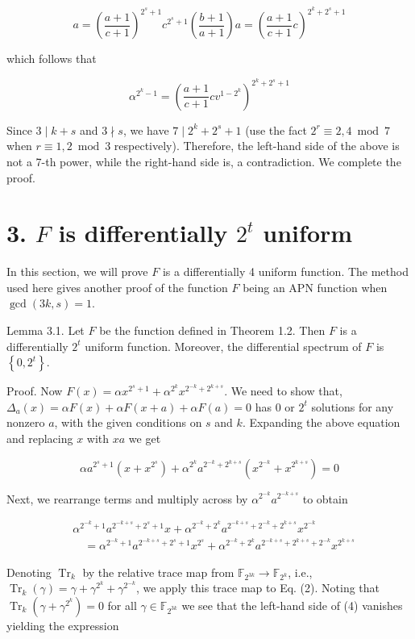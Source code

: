 \documentclass[10pt]{article}
\begin{document}
$$
a=\left(\frac{a+1}{c+1}\right)^{2^{s}+1} c^{2^{s}+1}\left(\frac{b+1}{a+1}\right) a=\left(\frac{a+1}{c+1} c\right)^{2^{k}+2^{s}+1}
$$

which follows that

$$
\alpha^{2^{k}-1}=\left(\frac{a+1}{c+1} c v^{1-2^{k}}\right)^{2^{k}+2^{s}+1}
$$

Since $3 \mid k+s$ and $3 \nmid s$, we have $7 \mid 2^{k}+2^{s}+1$ (use the fact $2^{r} \equiv 2,4 \bmod 7$ when $r \equiv 1,2 \bmod 3$ respectively). Therefore, the left-hand side of the above is not a 7-th power, while the right-hand side is, a contradiction. We complete the proof.

\section*{3. $F$ is differentially $2^{t}$ uniform}
In this section, we will prove $F$ is a differentially 4 uniform function. The method used here gives another proof of the function $F$ being an APN function when $\operatorname{gcd}(3 k, s)=1$.

Lemma 3.1. Let $F$ be the function defined in Theorem 1.2. Then $F$ is a differentially $2^{t}$ uniform function. Moreover, the differential spectrum of $F$ is $\left\{0,2^{t}\right\}$.

Proof. Now $F(x)=\alpha x^{2^{s}+1}+\alpha^{2^{k}} x^{2^{-k}+2^{k+s}}$. We need to show that, $\Delta_{a}(x)=\alpha F(x)+\alpha F(x+a)+ \alpha F(a)=0$ has 0 or $2^{t}$ solutions for any nonzero $a$, with the given conditions on $s$ and $k$. Expanding the above equation and replacing $x$ with $x a$ we get


\begin{equation*}
\alpha a^{2^{s}+1}\left(x+x^{2^{s}}\right)+\alpha^{2^{k}} a^{2^{-k}+2^{k+s}}\left(x^{2^{-k}}+x^{2^{k+s}}\right)=0 \tag{3}
\end{equation*}


Next, we rearrange terms and multiply across by $\alpha^{2^{-k}} a^{2^{-k+s}}$ to obtain


\begin{align*}
& \alpha^{2^{-k}+1} a^{2^{-k+s}+2^{s}+1} x+\alpha^{2^{-k}+2^{k}} a^{2^{-k+s}+2^{-k}+2^{k+s}} x^{2^{-k}} \\
& \quad=\alpha^{2^{-k}+1} a^{2^{-k+s}+2^{s}+1} x^{2^{s}}+\alpha^{2^{-k}+2^{k}} a^{2^{-k+s}+2^{k+s}+2^{-k}} x^{2^{k+s}} \tag{4}
\end{align*}


Denoting $\operatorname{Tr}_{k}$ by the relative trace map from $\mathbb{F}_{2^{3 k}} \rightarrow \mathbb{F}_{2^{k}}$, i.e., $\operatorname{Tr}_{k}(\gamma)=\gamma+\gamma^{2^{k}}+\gamma^{2^{-k}}$, we apply this trace map to Eq. (2). Noting that $\operatorname{Tr}_{k}\left(\gamma+\gamma^{2^{k}}\right)=0$ for all $\gamma \in \mathbb{F}_{2^{3 k}}$ we see that the left-hand side of (4) vanishes yielding the expression
\end{document}
